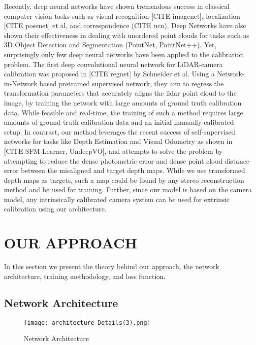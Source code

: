 \documentclass[letterpaper, 10 pt, conference]{ieeeconf}  %
\begin{document}
Recently, deep neural networks have shown tremendous success in classical computer vision tasks such as visual recognition [CITE imagenet], localization [CITE posenet] et al, and correspondence (CITE ucn). Deep Networks have also shown their effectiveness in dealing with unordered point clouds for tasks such as 3D Object Detection and Segmentation (PointNet, PointNet++).
Yet, surprisingly only few deep neural networks have been applied to the calibration problem. The first deep convolutional neural network for LiDAR-camera calibration was
proposed in [CITE regnet] by Schneider et al. Using a Network-in-Network based pretrained supervised network, they aim to regress the transformation parameters that accurately aligns the lidar point cloud to the image, by training the network with large amounts of ground truth calibration data.
While feasible and real-time, the training of such a method requires large amounts of ground truth calibration data and an initial manually calibrated setup. In contrast, our method leverages the recent success of self-supervised networks for tasks like Depth Estimation and Visual Odometry as shown in [CITE SFM-Learner, UndeepVO], and attempts to solve the problem by attempting to reduce the dense photometric error and dense point cloud distance error between the misaligned and target depth maps.
While we use transformed depth maps as targets, such a map could be found by any stereo reconstruction method and be used for training. 
Further, since our model is based on the camera model, any intrinsically calibrated camera system can be used for extrinsic calibration using our architecture.

\section{OUR APPROACH}

In this section we present the theory behind our approach, the network architecture, training methodology, and loss function.

\subsection{Network Architecture} 

\begin{figure}
\begin{center}
    \setlength{\fboxsep}{2pt}%
    \setlength{\fboxrule}{1pt}%
    
    \texttt{[image: architecture\_Details(3).png]}
\end{center}
    \caption{Network Architecture}
\label{fig:overall_net}
\end{figure}
\end{document}
